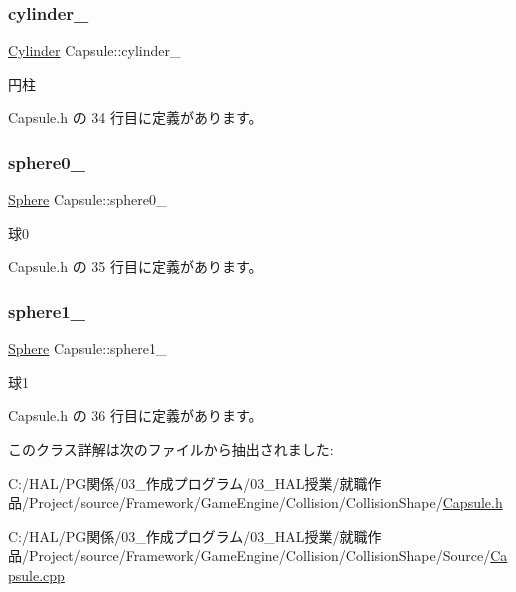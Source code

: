 \subsubsection{\texorpdfstring{cylinder\+\_\+}{cylinder\_}}
{\footnotesize\ttfamily \mbox{\hyperlink{class_cylinder}{Cylinder}} Capsule\+::cylinder\+\_\+\hspace{0.3cm}{\ttfamily [private]}}



円柱 



 Capsule.\+h の 34 行目に定義があります。

\mbox{\label{class_capsule_a37c7db7fe8cb06be2f374d7aba24267e}} 
\subsubsection{\texorpdfstring{sphere0\+\_\+}{sphere0\_}}
{\footnotesize\ttfamily \mbox{\hyperlink{class_sphere}{Sphere}} Capsule\+::sphere0\+\_\+\hspace{0.3cm}{\ttfamily [private]}}



球0 



 Capsule.\+h の 35 行目に定義があります。

\mbox{\label{class_capsule_ac478efc95993a85908a7cd2759133ab2}} 
\subsubsection{\texorpdfstring{sphere1\+\_\+}{sphere1\_}}
{\footnotesize\ttfamily \mbox{\hyperlink{class_sphere}{Sphere}} Capsule\+::sphere1\+\_\+\hspace{0.3cm}{\ttfamily [private]}}



球1 



 Capsule.\+h の 36 行目に定義があります。



このクラス詳解は次のファイルから抽出されました\+:\begin{DoxyCompactItemize}
\item 
C\+:/\+H\+A\+L/\+P\+G関係/03\+\_\+作成プログラム/03\+\_\+\+H\+A\+L授業/就職作品/\+Project/source/\+Framework/\+Game\+Engine/\+Collision/\+Collision\+Shape/\mbox{\hyperlink{_capsule_8h}{Capsule.\+h}}\item 
C\+:/\+H\+A\+L/\+P\+G関係/03\+\_\+作成プログラム/03\+\_\+\+H\+A\+L授業/就職作品/\+Project/source/\+Framework/\+Game\+Engine/\+Collision/\+Collision\+Shape/\+Source/\mbox{\hyperlink{_capsule_8cpp}{Capsule.\+cpp}}\end{DoxyCompactItemize}
